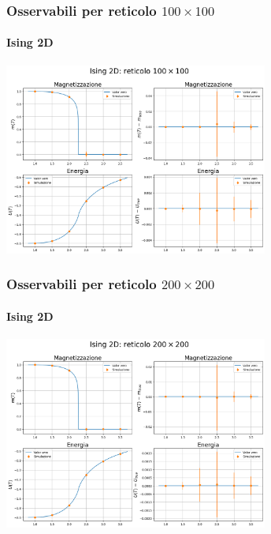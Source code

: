\begin{frame}
    \frametitle{Osservabili per reticolo $100 \times 100$}
    \framesubtitle{Ising 2D}

    \centering
    \includegraphics[width=0.65\textwidth]{Immagini/backupIsing2D/obs_100.png}

\end{frame}



\begin{frame}
    \frametitle{Osservabili per reticolo $200 \times 200$}
    \framesubtitle{Ising 2D}

    \centering
    \includegraphics[width=0.65\textwidth]{Immagini/backupIsing2D/obs_200.png}

\end{frame}



